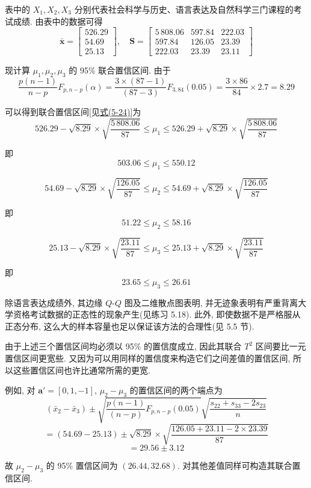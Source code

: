 表中的 $X_{1},X_{2},X_{3}$ 分别代表社会科学与历史、语言表达及自然科学三门课程的考试成绩. 由表中的数据可得
\[
\bar{\mathbf{x}}=\begin{bmatrix}526.29\\54.69\\25.13\end{bmatrix}, \quad \mathbf{S}=\begin{bmatrix}5\,808.06&597.84&222.03\\597.84&126.05&23.39\\222.03&23.39&23.11\end{bmatrix}
\]

现计算 $\mu_{1},\mu_{2},\mu_{3}$ 的 95\% 联合置信区间. 由于
\[
\frac{p(n-1)}{n-p}F_{p,n-p}(\alpha)=\frac{3\times(87-1)}{(87-3)}F_{3,84}(0.05)=\frac{3\times86}{84}\times2.7=8.29
\]

可以得到联合置信区间[见\hyperref[eq:5-24]{式(5-24)}]为
\[
526.29-\sqrt{8.29}\times\sqrt{\frac{5\,808.06}{87}}\le \mu_{1}\le 526.29+\sqrt{8.29}\times\sqrt{\frac{5\,808.06}{87}}
\]

即
\[
503.06\le \mu_{1}\le 550.12
\]

\[
54.69-\sqrt{8.29}\times\sqrt{\frac{126.05}{87}}\le \mu_{2}\le 54.69+\sqrt{8.29}\times\sqrt{\frac{126.05}{87}}
\]

即
\[
51.22\le \mu_{2}\le 58.16
\]

\[
25.13-\sqrt{8.29}\times\sqrt{\frac{23.11}{87}}\le \mu_{3}\le 25.13+\sqrt{8.29}\times\sqrt{\frac{23.11}{87}}
\]

即
\[
23.65\le \mu_{3}\le 26.61
\]

除语言表达成绩外, 其边缘 $Q$-$Q$ 图及二维散点图表明, 并无迹象表明有严重背离大学资格考试数据的正态性的现象产生(见练习 5.18). 此外, 即使数据不是严格服从正态分布, 这么大的样本容量也足以保证该方法的合理性(见 5.5 节).

由于上述三个置信区间均必须以 95\% 的置信度成立, 因此其联合 $T^{2}$ 区间要比一元置信区间更宽些. 又因为可以用同样的置信度来构造它们之间差值的置信区间, 所以这些置信区间也许比通常所需的更宽.

例如, 对 $\mathbf{a}'=[0,1,-1]$, $\mu_{2}-\mu_{3}$ 的置信区间的两个端点为
\[
(\bar{x}_{2}-\bar{x}_{3})\pm\sqrt{\frac{p(n-1)}{(n-p)}F_{p,n-p}(0.05)}\sqrt{\frac{s_{22}+s_{33}-2s_{23}}{n}}
\]
\[
=(54.69-25.13)\pm\sqrt{8.29}\times\sqrt{\frac{126.05+23.11-2\times23.39}{87}}
\]
\[
=29.56\pm3.12
\]

故 $\mu_{2}-\mu_{3}$ 的 95\% 置信区间为 $(26.44,32.68)$. 对其他差值同样可构造其联合置信区间.

